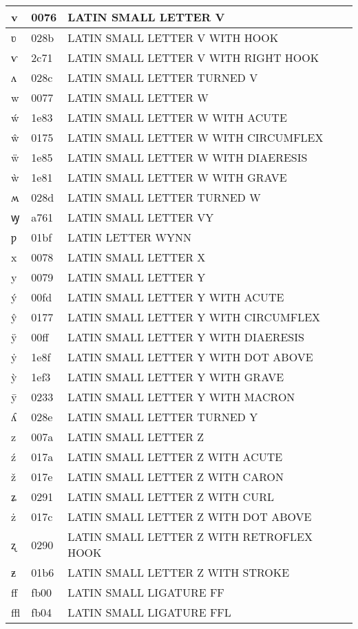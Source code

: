 \documentclass[12pt,letterpaper,openany]{book}
\begin{document}
\begin{center}
\begin{supertabular}{|m{0.25in}|m{0.5in}|m{4in}|}
v & 0076 & LATIN SMALL LETTER V\\\hline
ʋ & 028b & LATIN SMALL LETTER V WITH HOOK\\\hline
ⱱ & 2c71 & LATIN SMALL LETTER V WITH RIGHT HOOK\\\hline
ʌ & 028c & LATIN SMALL LETTER TURNED V\\\hline
w & 0077 & LATIN SMALL LETTER W\\\hline
ẃ & 1e83 & LATIN SMALL LETTER W WITH ACUTE\\\hline
ŵ & 0175 & LATIN SMALL LETTER W WITH CIRCUMFLEX\\\hline
ẅ & 1e85 & LATIN SMALL LETTER W WITH DIAERESIS\\\hline
ẁ & 1e81 & LATIN SMALL LETTER W WITH GRAVE\\\hline
ʍ & 028d & LATIN SMALL LETTER TURNED W\\\hline
ꝡ & a761 & LATIN SMALL LETTER VY\\\hline
ƿ & 01bf & LATIN LETTER WYNN\\\hline
x & 0078 & LATIN SMALL LETTER X\\\hline
y & 0079 & LATIN SMALL LETTER Y\\\hline
ý & 00fd & LATIN SMALL LETTER Y WITH ACUTE\\\hline
ŷ & 0177 & LATIN SMALL LETTER Y WITH CIRCUMFLEX\\\hline
ÿ & 00ff & LATIN SMALL LETTER Y WITH DIAERESIS\\\hline
ẏ & 1e8f & LATIN SMALL LETTER Y WITH DOT ABOVE\\\hline
ỳ & 1ef3 & LATIN SMALL LETTER Y WITH GRAVE\\\hline
ȳ & 0233 & LATIN SMALL LETTER Y WITH MACRON\\\hline
ʎ & 028e & LATIN SMALL LETTER TURNED Y\\\hline
z & 007a & LATIN SMALL LETTER Z\\\hline
ź & 017a & LATIN SMALL LETTER Z WITH ACUTE\\\hline
ž & 017e & LATIN SMALL LETTER Z WITH CARON\\\hline
ʑ & 0291 & LATIN SMALL LETTER Z WITH CURL\\\hline
ż & 017c & LATIN SMALL LETTER Z WITH DOT ABOVE\\\hline
ʐ & 0290 & LATIN SMALL LETTER Z WITH RETROFLEX HOOK\\\hline
ƶ & 01b6 & LATIN SMALL LETTER Z WITH STROKE\\\hline
ﬀ & fb00 & LATIN SMALL LIGATURE FF\\\hline
ﬄ & fb04 & LATIN SMALL LIGATURE FFL\\\hline

\end{supertabular}
\end{center}
\end{document}
